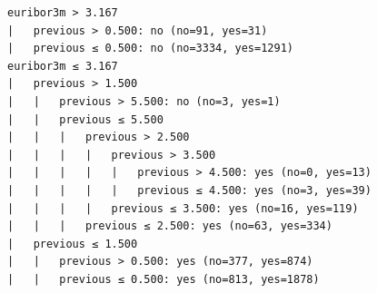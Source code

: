 \documentclass[prodmode]{acmsmall} %
\begin{document}
\begin{figure}[!t]
    \begin{verbatim}
euribor3m > 3.167
|   previous > 0.500: no (no=91, yes=31)
|   previous ≤ 0.500: no (no=3334, yes=1291)
euribor3m ≤ 3.167
|   previous > 1.500
|   |   previous > 5.500: no (no=3, yes=1)
|   |   previous ≤ 5.500
|   |   |   previous > 2.500
|   |   |   |   previous > 3.500
|   |   |   |   |   previous > 4.500: yes (no=0, yes=13)
|   |   |   |   |   previous ≤ 4.500: yes (no=3, yes=39)
|   |   |   |   previous ≤ 3.500: yes (no=16, yes=119)
|   |   |   previous ≤ 2.500: yes (no=63, yes=334)
|   previous ≤ 1.500
|   |   previous > 0.500: yes (no=377, yes=874)
|   |   previous ≤ 0.500: yes (no=813, yes=1878)
\end{verbatim}
\end{figure}
\end{document}
